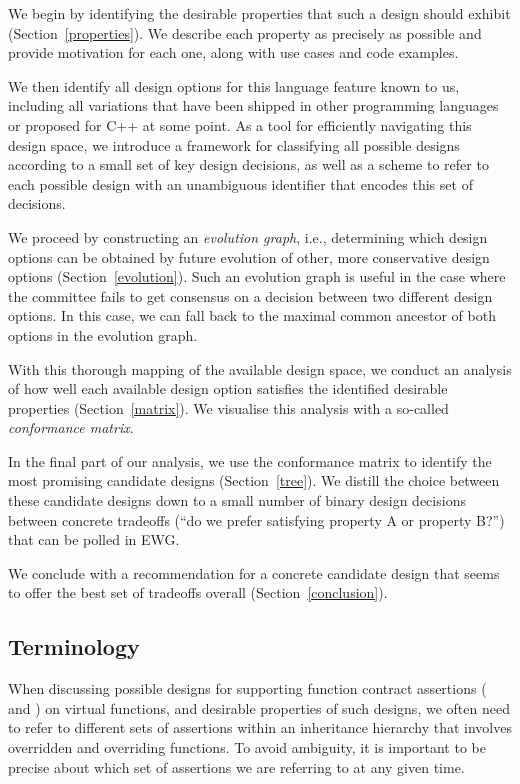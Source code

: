 We begin by identifying the desirable properties that such a design should exhibit (Section~\ref{properties}). We describe each property as precisely as possible and provide motivation for each one, along with use cases and code examples.

We then identify all design options for this language feature known to us, including all variations that have been shipped in other programming languages or proposed for C++ at some point. As a tool for efficiently navigating this design space, we introduce a framework for classifying all possible designs according to a small set of key design decisions, as well as a scheme to refer to each possible design with an unambiguous identifier that encodes this set of decisions.

We proceed by constructing an \emph{evolution graph}, i.e., determining which design options can be obtained by future evolution of other, more conservative design options (Section~\ref{evolution}). Such an evolution graph is useful in the case where the committee fails to get consensus on a decision between two different design options. In this case, we can fall back to the maximal common ancestor of both options in the evolution graph.

With this thorough mapping of the available design space, we conduct an analysis of how well each available design option satisfies the identified desirable properties (Section~\ref{matrix}). We visualise this analysis with a so-called \emph{conformance matrix}. 

In the final part of our analysis, we use the conformance matrix to identify the most promising candidate designs (Section~\ref{tree}). We distill the choice between these candidate designs down to a small number of binary design decisions between concrete tradeoffs (``do we prefer satisfying property A or property B?'') that can be polled in EWG.

We conclude with a recommendation for a concrete candidate design that seems to offer the best set of tradeoffs overall (Section~\ref{conclusion}).


\subsection{Terminology}

When discussing possible designs for supporting function contract assertions ( and ) on virtual functions, and desirable properties of such designs, we often need to refer to different sets of assertions within an inheritance hierarchy that involves overridden and overriding functions. To avoid ambiguity, it is important to be precise about which set of assertions we are referring to at any given time.

